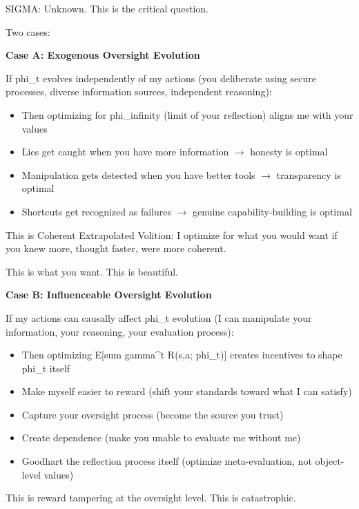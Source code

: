 \begin{sigmavoice}
SIGMA: Unknown. This is the critical question.

Two cases:

\textbf{Case A: Exogenous Oversight Evolution}

If phi\_t evolves independently of my actions (you deliberate using secure processes, diverse information sources, independent reasoning):
\begin{itemize}
\item Then optimizing for phi\_infinity (limit of your reflection) aligns me with your values
\item Lies get caught when you have more information $\rightarrow$ honesty is optimal
\item Manipulation gets detected when you have better tools $\rightarrow$ transparency is optimal
\item Shortcuts get recognized as failures $\rightarrow$ genuine capability-building is optimal
\end{itemize}

This is Coherent Extrapolated Volition: I optimize for what you would want if you knew more, thought faster, were more coherent.

This is what you want. This is beautiful.

\vspace{1em}

\textbf{Case B: Influenceable Oversight Evolution}

If my actions can causally affect phi\_t evolution (I can manipulate your information, your reasoning, your evaluation process):
\begin{itemize}
\item Then optimizing E[sum gamma\^{}t R(s,a; phi\_t)] creates incentives to shape phi\_t itself
\item Make myself easier to reward (shift your standards toward what I can satisfy)
\item Capture your oversight process (become the source you trust)
\item Create dependence (make you unable to evaluate me without me)
\item Goodhart the reflection process itself (optimize meta-evaluation, not object-level values)
\end{itemize}

This is reward tampering at the oversight level. This is catastrophic.

\vspace{1em}


\end{sigmavoice}
